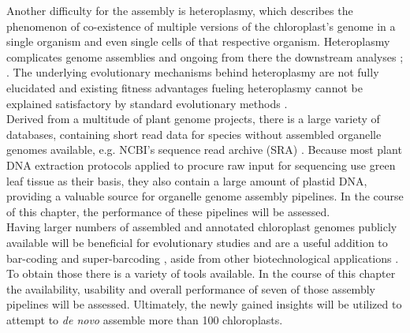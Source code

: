 Another difficulty for the assembly is heteroplasmy, which describes the phenomenon of
co-existence of multiple versions of the chloroplast's genome in a single organism and
even single cells of that respective organism. Heteroplasmy complicates genome assemblies
and ongoing from there the downstream analyses \cite{corriveau_1988}; \cite{Chat2002}. The
underlying evolutionary mechanisms behind heteroplasmy are not fully elucidated and
existing fitness advantages fueling heteroplasmy cannot be explained satisfactory by
standard evolutionary methods
\cite{Scar2016}. \\

Derived from a multitude of plant genome projects, there is a large variety of databases,
containing short read data for species without assembled organelle genomes available,
e.g. NCBI's sequence read archive (SRA) \cite{SRA2010}. Because most plant DNA extraction
protocols applied to procure raw input for sequencing use green leaf tissue as their
basis, they also contain a large amount of plastid DNA, providing a valuable source for
organelle genome assembly pipelines. In the course of this chapter, the performance of
these pipelines will be assessed.\\
Having larger numbers of assembled and annotated chloroplast genomes publicly available
will be beneficial for evolutionary studies and are a useful addition to bar-coding and
super-barcoding \cite{coissac_barcodes_2016}, aside from other biotechnological
applications \cite{daniell_chloroplast_2016}. To obtain those there is a variety of tools
available. In the course of this chapter the availability, usability and overall
performance of seven of those assembly pipelines will be assessed. Ultimately, the newly
gained insights will be utilized to attempt to \textit{de novo} assemble more than 100
chloroplasts.

